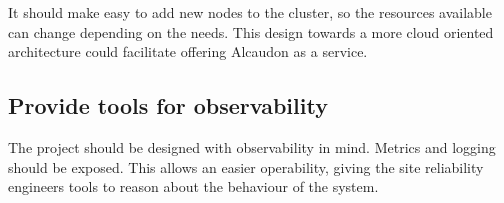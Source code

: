 It should make easy to add new nodes to the cluster, so the resources available
can change depending on the needs. This design towards a more cloud oriented
architecture could facilitate offering Alcaudon as a service.

\subsection{Provide tools for observability}

The project should be designed with observability in mind. Metrics and logging
should be exposed. This allows an easier operability, giving the site
reliability engineers tools to reason about the behaviour of the system.
